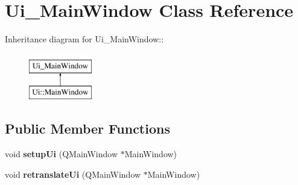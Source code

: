 \hypertarget{classUi__MainWindow}{
\section{Ui\_\-MainWindow Class Reference}
\label{classUi__MainWindow}
}
Inheritance diagram for Ui\_\-MainWindow::\begin{figure}[H]
\begin{center}
\leavevmode
\includegraphics[height=2cm]{classUi__MainWindow}
\end{center}
\end{figure}
\subsection*{Public Member Functions}
\begin{DoxyCompactItemize}
\item 
\hypertarget{classUi__MainWindow_acf4a0872c4c77d8f43a2ec66ed849b58}{
void {\bfseries setupUi} (QMainWindow $\ast$MainWindow)}
\label{classUi__MainWindow_acf4a0872c4c77d8f43a2ec66ed849b58}

\item 
\hypertarget{classUi__MainWindow_a097dd160c3534a204904cb374412c618}{
void {\bfseries retranslateUi} (QMainWindow $\ast$MainWindow)}
\label{classUi__MainWindow_a097dd160c3534a204904cb374412c618}

\end{DoxyCompactItemize}
